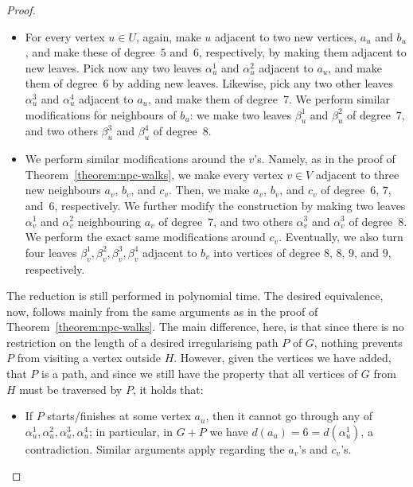 \documentclass[a4paper,11pt,dvipsnames]{elsarticle}
\begin{document}
\begin{proof}
\begin{itemize}
    \item For every vertex $u \in U$, again, make $u$ adjacent to two new vertices, $a_u$ and $b_u$, and make these of degree~$5$ and~$6$, respectively, by making them adjacent to new leaves. Pick now any two leaves $\alpha^1_u$ and $\alpha^2_u$ adjacent to $a_u$, and make them of degree~$6$ by adding new leaves. Likewise, pick any two other leaves $\alpha_u^3$ and $\alpha_u^4$ adjacent to $a_u$, and make them of degree~$7$. We perform similar modifications for neighbours of $b_u$: we make two leaves $\beta^1_u$ and $\beta^2_u$ of degree~$7$, and two others $\beta^3_u$ and $\beta^4_u$ of degree~$8$. 
    
    \item We perform similar modifications around the $v$'s. Namely, as in the proof of Theorem~\ref{theorem:npc-walks}, we make every vertex $v \in V$ adjacent to three new neighbours $a_v$, $b_v$, and $c_v$. Then, we make $a_v$, $b_v$, and $c_v$ of degree~$6$, $7$, and~$6$, respectively. We further modify the construction by making two  leaves $\alpha_v^1$ and $\alpha_v^2$ neighbouring $a_v$ of degree~$7$, and two others $\alpha_v^3$ and $\alpha_v^3$ of degree~$8$. We perform the exact same modifications around $c_v$.
    Eventually, we also turn four leaves $\beta_v^1,\beta_v^2,\beta_v^3,\beta_v^4$ adjacent to $b_v$ into vertices of degree $8$, $8$, $9$, and $9$, respectively.
\end{itemize}

The reduction is still performed in polynomial time.
The desired equivalence, now, follows mainly from the same arguments as in the proof of Theorem~\ref{theorem:npc-walks}. The main difference, here, is that since there is no restriction on the length of a desired irregularising path $P$ of $G$, nothing prevents $P$ from visiting a vertex outside $H$.
However, given the vertices we have added, that $P$ is a path, and since we still have the property that all vertices of $G$ from $H$ must be traversed by $P$, it holds that:

\begin{itemize}
    \item If $P$ starts/finishes at some vertex $a_u$, then it cannot go through any of $\alpha_u^1,\alpha_u^2,\alpha_u^3,\alpha_u^4$; in particular, in $G+P$ we have $d(a_u)=6=d(\alpha_u^1)$, a contradiction. Similar arguments apply regarding the $a_v$'s and $c_v$'s.
    

\end{itemize}
\end{proof}
\end{document}
